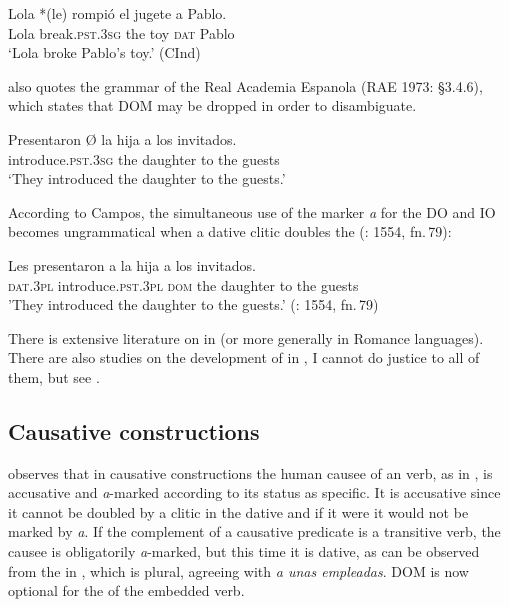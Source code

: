 \documentclass[output=paper]{LSP/langsci}
\begin{document}
\ea%
\label{11-he-ex:34}
\gll Lola *(le) rompió el jugete a Pablo.\\ %
Lola \textsc{} break.\textsc{pst.3sg} the toy \textsc{dat} Pablo\\
\glt ‘Lola broke Pablo’s toy.’ (CInd)
\z

\citet[1554]{Campos1999Transitividad} also quotes the grammar of the Real Academia Espanola (RAE 1973: §3.4.6), which states that DOM may be dropped in order to disambiguate.

\ea%
\label{11-he-ex:35}

\gll Presentaron Ø la hija a los invitados.\\
introduce.\textsc{pst.3sg} {} the daughter to the guests\\
\glt ‘They introduced the daughter to the guests.’
\z

According to Campos, the simultaneous use of the marker \textit{a} for the DO and IO becomes ungrammatical when a dative clitic doubles the   (\citealt{Campos1999Transitividad}: 1554, fn.\,79):

\ea%
\label{11-he-ex:36}
\gll *Les presentaron a la hija a los invitados.\\
\textsc{dat.3pl} introduce.\textsc{pst.3pl} \textsc{dom} the daughter to the guests\\
\glt 'They introduced the daughter to the guests.’ (\citealt{Campos1999Transitividad}: 1554, fn.\,79)
\z

There is extensive literature on  in  (or more generally in Romance languages). 
There are also studies on the development of  in ,  I cannot do justice to all of them, but see \citet{Fontana1993Phrase,Fischeretal2003Explaining,Gabrieletal2010Information,vonHeusinger2017Case}.

\subsection{Causative constructions} %
\label{11-subsec:3-2}

\citet[24]{Lopez2012Indefinite} observes that in causative constructions the human  causee of an  verb, as in , is accusative and \textit{a}-marked according to its  status as specific. It is accusative since it cannot be doubled by a clitic in the dative and if it were  it would not be marked by \textit{a}. If the complement of a causative predicate is a transitive verb, the causee is obligatorily \textit{a}-marked, but this time it is dative, as can be observed from the  in , which is plural, agreeing with \textit{a unas empleadas}. DOM is now optional for the  of the embedded verb.
\end{document}
